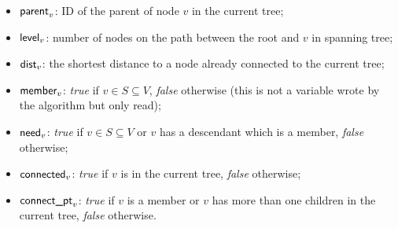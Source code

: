 \documentclass[11pt]{article}
\newcommand{\id}{\mbox{ID}}
\newcommand{\parent}{\mbox{\sf parent}}
\newcommand{\level}{\mbox{\sf level}}
\newcommand{\dist}{\mbox{\sf dist}}
\newcommand{\need}{\mbox{\sf need}}
\newcommand{\connect}{\mbox{\sf connected}}
\newcommand{\member}{\mbox{\sf member}}
\newcommand{\connectpt}{\mbox{\sf connect\_pt}}
\begin{document}
\begin{itemize}
\item $\parent_v$: $\id$ of the parent of node $v$ in the current tree;
\item $\level_v$: number of nodes on the path between the root and $v$
in spanning tree;
\item $\dist_v$: the shortest distance to a node already connected to the current tree;
\item $\member_v$: \emph{true} if $v \in S \subseteq V$, \emph{false} otherwise (this is not a variable wrote by the algorithm but only read);
\item $\need_v$: \emph{true} if $v \in S \subseteq V$ or $v$ has a descendant which is a member, \emph{false} otherwise;
\item $\connect_v$: \emph{true} if $v$ is in the current tree, \emph{false} otherwise;
\item $\connectpt_v$: \emph{true} if $v$ is a member or $v$ has more than one children in the current tree, \emph{false} otherwise.
\end{itemize}
\end{document}
